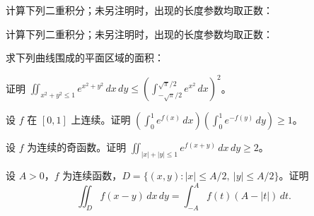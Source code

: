 \noindent\begin{minipage}{\textwidth}
计算下列二重积分；未另注明时，出现的长度参数均取正数：
\end{minipage}\par\vfill
\noindent\begin{minipage}{\textwidth}
计算下列二重积分；未另注明时，出现的长度参数均取正数：
\end{minipage}\par\vfill
\noindent\begin{minipage}{\textwidth}
求下列曲线围成的平面区域的面积：
\end{minipage}\par\vfill
\newpage
\noindent\begin{minipage}{\textwidth}
证明 $\displaystyle\iint_{x^2+y^2\le1}e^{x^2+y^2}\,dx\,dy\le\left(\int_{-\sqrt{\pi}/2}^{\sqrt{\pi}/2}e^{x^2}\,dx\right)^2$。
\end{minipage}\par\vfill
\noindent\begin{minipage}{\textwidth}
设 $f$ 在 $[0,1]$ 上连续。证明 $\displaystyle\left(\int_0^1e^{f(x)}\,dx\right)\left(\int_0^1e^{-f(y)}\,dy\right)\ge1$。
\end{minipage}\par\vfill
\noindent\begin{minipage}{\textwidth}
设 $f$ 为连续的奇函数。证明 $\displaystyle\iint_{|x|+|y|\le1}e^{f(x+y)}\,dx\,dy\ge2$。
\end{minipage}\par\vfill
\noindent\begin{minipage}{\textwidth}
设 $A>0$，$f$ 为连续函数，$D=\{(x,y):|x|\le A/2,\ |y|\le A/2\}$。证明\[\iint_Df(x-y)\,dx\,dy=\int_{-A}^{A}f(t)(A-|t|)\,dt.\]
\end{minipage}\par\vfill
